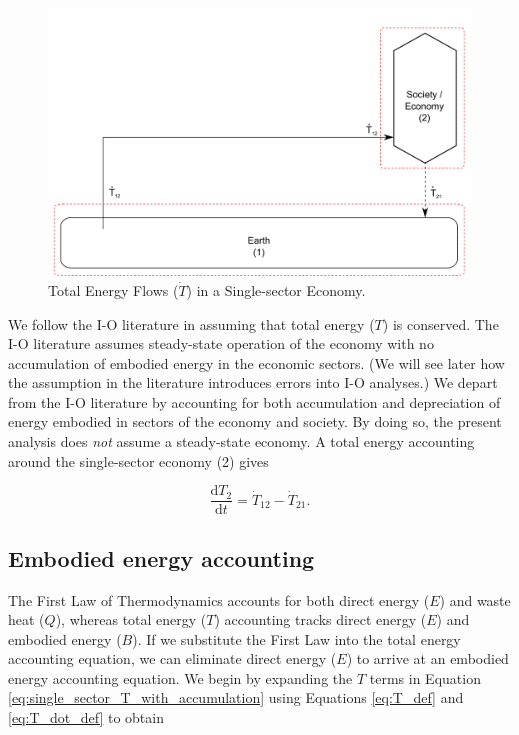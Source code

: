 \documentclass[authoryear,preprint,review,12pt]{elsarticle}
\begin{document}
\begin{figure}[h!]
\includegraphics[width=1.0\linewidth]{images/I-O_one_sector_total_energy.pdf}
\caption{Total Energy Flows ($\dot{T}$) in a Single-sector Economy.}
\label{fig:single_sector_flows_2}
\end{figure}

We follow the I-O literature in assuming that total energy ($T$) is conserved. The I-O literature assumes steady-state operation of the economy with no accumulation of embodied energy in the economic sectors. (We will see later how the assumption in the literature introduces errors into I-O analyses.) We depart from the I-O literature by accounting for both accumulation and depreciation of energy embodied in sectors of the economy and society. By doing so, the present analysis does \emph{not} assume a steady-state economy. A total energy accounting around the single-sector economy (2) gives

\begin{equation} \label{eq:single_sector_T_with_accumulation}
	\frac{\mathrm{d}T_{2}}{\mathrm{d}t} = \dot{T}_{12}  - \dot{T}_{21}.
\end{equation}

\subsection{Embodied energy accounting}

The First Law of Thermodynamics accounts for both direct energy ($E$) and waste heat ($Q$), whereas total energy ($T$) accounting tracks direct energy ($E$) and embodied energy ($B$). If we substitute the First Law into the total energy accounting equation, we can eliminate direct energy ($E$) to arrive at an embodied energy accounting equation. We begin by expanding the $T$ terms in Equation \ref{eq:single_sector_T_with_accumulation} using Equations \ref{eq:T_def} and \ref{eq:T_dot_def} to obtain
\end{document}
